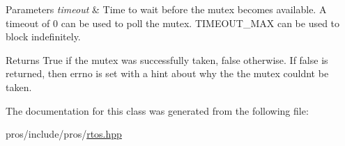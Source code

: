 \begin{DoxyParams}{Parameters}
{\em timeout} & Time to wait before the mutex becomes available. A timeout of 0 can be used to poll the mutex. T\+I\+M\+E\+O\+U\+T\+\_\+\+M\+AX can be used to block indefinitely.\\
\hline
\end{DoxyParams}
\begin{DoxyReturn}{Returns}
True if the mutex was successfully taken, false otherwise. If false is returned, then errno is set with a hint about why the the mutex couldn\textquotesingle{}t be taken. 
\end{DoxyReturn}


The documentation for this class was generated from the following file\+:\begin{DoxyCompactItemize}
\item 
pros/include/pros/\hyperlink{rtos_8hpp}{rtos.\+hpp}\end{DoxyCompactItemize}
